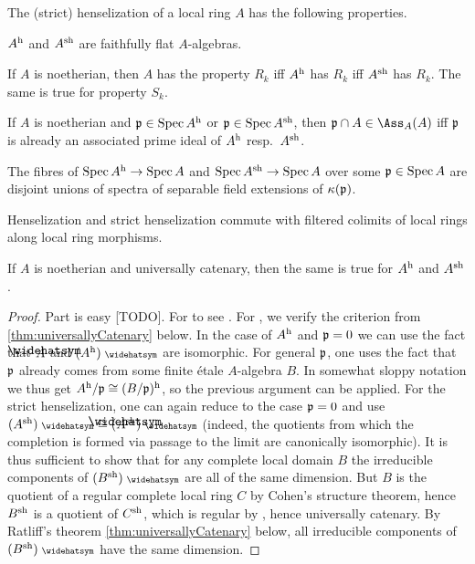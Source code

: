 \documentclass[a4paper, 10pt, oneside, DIV=9, chapterprefix=true, numbers=enddot, bibliography=totoc]{scrbook}
\begin{document}
\begin{fact}\label{fact:moarHenselization}
	The (strict) henselization of a local ring $A$ has the following properties.
	\begin{alphanumerate}
		\item $A^{\mathrm{h}}$ and $A^{\mathrm{sh}}$ are faithfully flat $A$-algebras.
		\item If $A$ is noetherian, then $A$ has the property $R_k$ iff $A^{\mathrm{h}}$ has $R_k$ iff $A^{\mathrm{sh}}$ has $R_k$. The same is true for property $S_k$.
		\item If $A$ is noetherian and $\mathfrak{p}\in \operatorname{Spec} A^{\mathrm{h}}$ or $\mathfrak{p}\in\operatorname{Spec} A^{\mathrm{sh}}$, then $\pp\cap A\in \Ass_A(A)$ iff $\mathfrak{p}$ is already an associated prime ideal of $A^{\mathrm{h}}$ resp.\ $A^{\mathrm{sh}}$.
		\item The fibres of $\Spec A^\h\morphism \Spec A$ and $\Spec A^\sh\morphism \Spec A$ over some $\mathfrak{p}\in \operatorname{Spec} A$ are disjoint unions of spectra of separable field extensions of $\kappa(\mathfrak{p})$.
		\item Henselization and strict henselization commute with filtered colimits of local rings along local ring morphisms.
		\item If $A$ is noetherian and universally catenary, then the same is true for $A^{\mathrm{h}}$ and $A^{\mathrm{sh}}$.
	\end{alphanumerate}
\end{fact}
\begin{proof}
	Part  is easy [TODO]. For  to  see \cite[(18.6)~and~(18.8)]{egaIV4}. For , we verify the criterion from \cref{thm:universallyCatenary} below. In the case of $A^{\mathrm{h}}$ and $\mathfrak{p}=0$ we can use the fact that $\roof{A}$ and $(A^\h)^\complete$ are isomorphic. For general $\mathfrak{p}$, one uses the fact that $\mathfrak{p}$ already comes from some finite étale $A$-algebra $B$. In somewhat sloppy notation we thus get $A^{\mathrm{h}}/\mathfrak{p}\cong (B/\mathfrak{p})^{\mathrm{h}}$, so the previous argument can be applied. For the strict henselization, one can again reduce to the case $\mathfrak{p}=0$ and use $(A^\sh)^\complete\cong (\roof{A}^\sh)^\complete$ (indeed, the quotients from which the completion is formed via passage to the limit are canonically isomorphic). It is thus sufficient to show that for any complete local domain $B$ the irreducible components of $(B^\sh)^\complete$ are all of the same dimension. But $B$ is the quotient of a regular complete local ring $C$ by Cohen's structure theorem, hence $B^{\mathrm{sh}}$ is a quotient of $C^{\mathrm{sh}}$, which is regular by , hence universally catenary. By Ratliff's theorem \cref{thm:universallyCatenary} below, all irreducible components of $(B^\sh)^\complete$ have the same dimension.
\end{proof}
\end{document}
